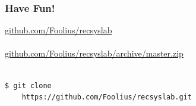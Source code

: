 \documentclass[mathserif,svgnames]{beamer}
\begin{document}
\begin{frame}[fragile]
    \frametitle{Have Fun!}
    \url{github.com/Foolius/recsyslab}\\
    \hspace*{8cm}\\
    \url{github.com/Foolius/recsyslab/archive/master.zip}\\
    \hspace*{8cm}\\
    \begin{lstlisting}[style=pseudocode]
$ git clone 
    https://github.com/Foolius/recsyslab.git
    \end{lstlisting}
\end{frame}


%
%

%
%
%
%
%
%
%
\end{document}
